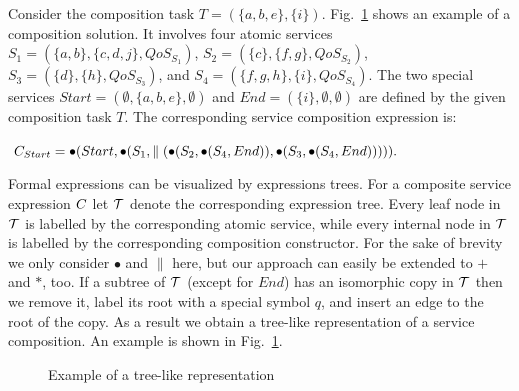 \begin{example}
Consider the composition task $T=(\{a, b, e\},\{ i\})$. Fig.~\ref{fig:ExampleOfRepresentation} shows an example of a composition solution. It involves four atomic services $S_1=(\{a, b \}, \{c, d, j \}, QoS_{S_1})$, $S_2=(\{c \}, \{f, g \}, QoS_{S_2})$, $S_3=(\{d \}, \{h \}, QoS_{S_3})$, and $S_4=(\{f, g, h \}, \{ i \}, QoS_{S_4})$. The two special services $Start=(\emptyset,\{a,b,e\},\emptyset)$ and $End=(\{i\},\emptyset,\emptyset)$ are defined by the given composition task $T$. The corresponding service composition expression is:

\noindent $C_{Start}=\bullet(Start,\bullet( S_1,\parallel(\bullet(S_2,\bullet(S_4,End)),\bullet(S_3,\bullet(S_4,End))))).$
\end{example}

Formal expressions can be visualized by expressions trees. For a composite service expression $C$ let $\mathcal{T}$ denote the corresponding expression tree. 
Every leaf node in $\mathcal{T}$ is labelled by the corresponding atomic service, while every internal node in $\mathcal{T}$ is labelled by the corresponding composition constructor. For the sake of brevity we only consider $\bullet$ and $\parallel$ here, but our approach can easily be extended to $+$ and $\ast$, too. If a subtree of $\mathcal{T}$ (except for $End$) has an isomorphic copy in $\mathcal{T}$ then we remove it, label its root with a special symbol $q$, and insert an edge to the root of the copy. As a result we obtain a tree-like representation of a service composition. An example is shown in Fig.~\ref{fig:ExampleOfRepresentation}.

\begin{figure}[h!tb]
\centering
 \caption{Example of a tree-like representation}
 \label{fig:ExampleOfRepresentation}
\end{figure}

